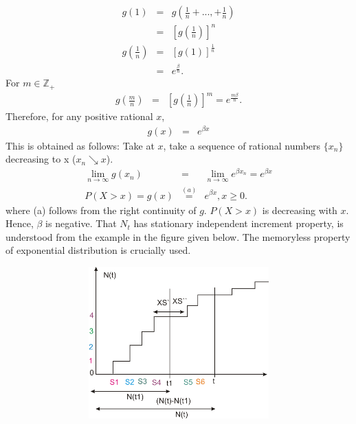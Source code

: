 \documentclass[11 pt]{article}
\theoremstyle{plain}
\theoremstyle{definition}
\theoremstyle{remark}
\begin{document}
              \begin{eqnarray*}
              g(1) &=&  g\left(\frac{1}{n}+..., +\frac{1}{n}\right) \\
             &=& \left[g\left(\frac{1}{n}\right)\right]^{n}\\
           g\left(\frac{1}{n}\right) &=&[g(1)]^{\frac{1}{n}}\\
          &=& e^{\frac{\beta}{n}}.
           \end{eqnarray*}
           For $ m \in \mathbb{Z}_{+}$
           \begin{eqnarray*}
                g\left(\frac{m}{n}\right) &=& \left[g\left(\frac{1}{n}\right)\right]^{m}= e^{\frac{m \beta}{n}}.
             \end{eqnarray*}
             Therefore, for any positive rational $x$,
              \begin{eqnarray*}
            g(x) &=& e ^{\beta x}
          \end{eqnarray*}
         This is obtained as follows:  Take at $x$, take a sequence of rational numbers $\{x_n\}$ decreasing to x ($x_{n}\searrow x$). 
           \begin{eqnarray*}
               \lim_{n\rightarrow \infty} g(x_n) &=&   \lim_{n\rightarrow \infty} e^{\beta x_{n}}= e^{\beta x}\\
         P(X>x)=g(x)&\stackrel{(a)}{=} &e^{\beta x}, x \geq 0.
\end{eqnarray*}
where (a) follows from the right continuity of $g$. $P (X>x)$  is decreasing  with $x$. Hence, $\beta $ is negative.  That ${N_{t}}$ has stationary independent increment property, is understood from the example in the figure given below. The memoryless property of exponential distribution is crucially used. 
\begin{figure}[h!t]
\center
  \includegraphics[width=5in, height=2.3in]{notes2.png}\\
\end{figure}
\end{document}
